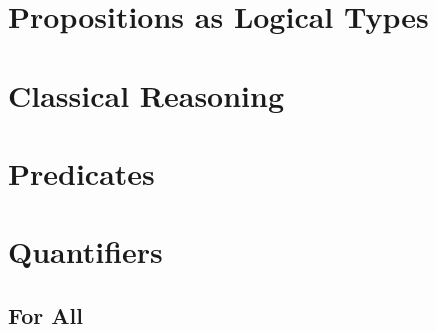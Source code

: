 \documentclass{book}
\begin{document}
\hypertarget{pandoc.profile.debug__pandoc__debug__src__dmt1__lectures__l07_predicatelogic__01_propsaslogicaltypes.lean.md}{}
\hypertarget{pandoc.profile.debug__pandoc__debug__src__dmt1__lectures__l07_predicatelogic__01_propsaslogicaltypes.lean.md__propositions-as-logical-types}{%
\section{Propositions as Logical Types}\label{pandoc.profile.debug__pandoc__debug__src__dmt1__lectures__l07_predicatelogic__01_propsaslogicaltypes.lean.md__propositions-as-logical-types}}

\hypertarget{pandoc.profile.debug__pandoc__debug__src__dmt1__lectures__l07_predicatelogic__03_classicalreasoning.lean.md}{}
\hypertarget{pandoc.profile.debug__pandoc__debug__src__dmt1__lectures__l07_predicatelogic__03_classicalreasoning.lean.md__classical-reasoning}{%
\section{Classical Reasoning}\label{pandoc.profile.debug__pandoc__debug__src__dmt1__lectures__l07_predicatelogic__03_classicalreasoning.lean.md__classical-reasoning}}

\hypertarget{pandoc.profile.debug__pandoc__debug__src__dmt1__lectures__l07_predicatelogic__04_predicates.lean.md}{}
\hypertarget{pandoc.profile.debug__pandoc__debug__src__dmt1__lectures__l07_predicatelogic__04_predicates.lean.md__predicates}{%
\section{Predicates}\label{pandoc.profile.debug__pandoc__debug__src__dmt1__lectures__l07_predicatelogic__04_predicates.lean.md__predicates}}

\hypertarget{pandoc.profile.debug__pandoc__debug__src__dmt1__lectures__l07_predicatelogic__05_quantifiers.lean.md}{}
\hypertarget{pandoc.profile.debug__pandoc__debug__src__dmt1__lectures__l07_predicatelogic__05_quantifiers.lean.md__quantifiers}{%
\section{Quantifiers}\label{pandoc.profile.debug__pandoc__debug__src__dmt1__lectures__l07_predicatelogic__05_quantifiers.lean.md__quantifiers}}

\hypertarget{pandoc.profile.debug__pandoc__debug__src__dmt1__lectures__l07_predicatelogic__05_quantifiers_all.lean.md}{}
\hypertarget{pandoc.profile.debug__pandoc__debug__src__dmt1__lectures__l07_predicatelogic__05_quantifiers_all.lean.md__for-all}{%
\subsection{For All}\label{pandoc.profile.debug__pandoc__debug__src__dmt1__lectures__l07_predicatelogic__05_quantifiers_all.lean.md__for-all}}
\end{document}
